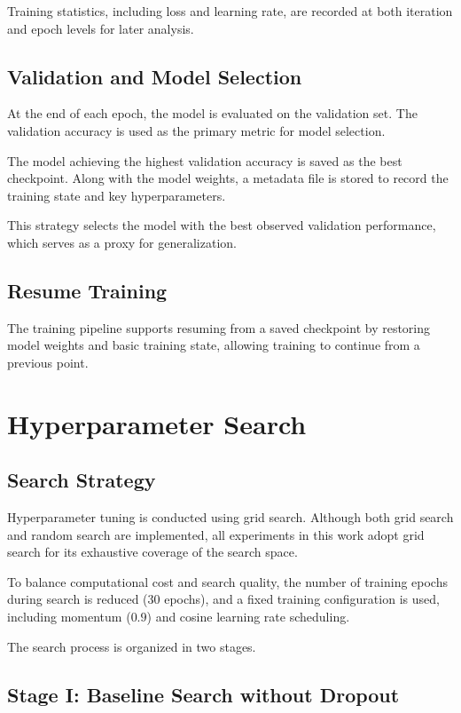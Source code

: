 \documentclass[11pt]{article}
\begin{document}
Training statistics, including loss and learning rate, are recorded at both iteration and epoch levels for later analysis.

\subsection{Validation and Model Selection}

At the end of each epoch, the model is evaluated on the validation set. The validation accuracy is used as the primary metric for model selection.

The model achieving the highest validation accuracy is saved as the best checkpoint. Along with the model weights, a metadata file is stored to record the training state and key hyperparameters.

This strategy selects the model with the best observed validation performance, which serves as a proxy for generalization.

\subsection{Resume Training}

The training pipeline supports resuming from a saved checkpoint by restoring model weights and basic training state, allowing training to continue from a previous point.

\section{Hyperparameter Search}

\subsection{Search Strategy}

Hyperparameter tuning is conducted using grid search. Although both grid search and random search are implemented, all experiments in this work adopt grid search for its exhaustive coverage of the search space.

To balance computational cost and search quality, the number of training epochs during search is reduced (30 epochs), and a fixed training configuration is used, including momentum ($0.9$) and cosine learning rate scheduling.

The search process is organized in two stages.

\subsection{Stage I: Baseline Search without Dropout}
\end{document}
